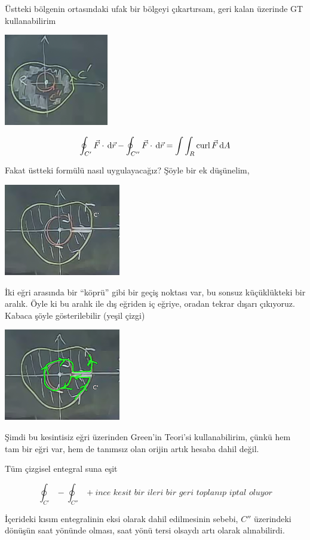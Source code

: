 \documentclass[12pt,fleqn]{article}\usepackage{../../common}
\begin{document}
Üstteki bölgenin ortasındaki ufak bir bölgeyi çıkartırsam, geri kalan
üzerinde GT kullanabilirim

\includegraphics[height=4cm]{24_4.png}

$$
\oint_{C'} \vec{F} \cdot \,\mathrm{d}\vec{r} - 
\oint_{C''} \vec{F} \cdot \,\mathrm{d}\vec{r}  =
\int \int_R \operatorname{curl} \vec{F} \,\mathrm{d} A 
$$
 
Fakat üstteki formülü nasıl uygulayacağız? Şöyle bir ek düşünelim, 

\includegraphics[height=4cm]{24_5.png}

İki eğri arasında bir ``köprü'' gibi bir geçiş noktası var, bu sonsuz
küçüklükteki bir aralık. Öyle ki bu aralık ile dış eğriden iç eğriye,
oradan tekrar dışarı çıkıyoruz. Kabaca şöyle gösterilebilir (yeşil çizgi)

\includegraphics[height=4cm]{24_6.png}

Şimdi bu kesintisiz eğri üzerinden Green'in Teori'si kullanabilirim, çünkü
hem tam bir eğri var, hem de tanımsız olan orijin artık hesaba dahil
değil. 

Tüm çizgisel entegral suna eşit 

$$
\oint_{C'} - \oint_{C''} +
\textit{ince kesit bir ileri bir geri toplanıp iptal oluyor}
$$ 

İçerideki kısım entegralinin eksi olarak dahil edilmesinin sebebi, $C''$
üzerindeki dönüşün saat yönünde olması, saat yönü tersi olsaydı artı olarak
alınabilirdi. 
\end{document}
